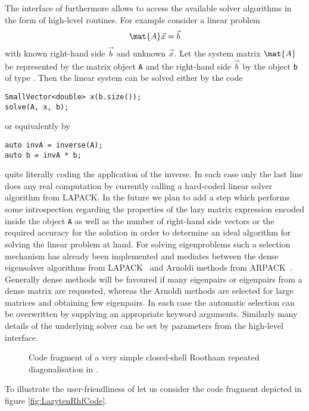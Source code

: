 The interface of \lazyten furthermore allows
to access the available solver algorithms
in the form of high-level routines.
For example consider a linear problem
\[\mat{A} \vec{x} = \vec{b}\]
with known right-hand side $\vec{b}$ and unknown $\vec{x}$.
Let the system matrix $\mat{A}$ be represented by the \lazyten matrix object \texttt{A}
and the right-hand side $\vec{b}$ by the object \texttt{b}
of type .
Then the linear system can be solved either by the code
\begin{lstlisting}[style=c++]
SmallVector<double> x(b.size());
solve(A, x, b);
\end{lstlisting}
or equivalently by
\begin{lstlisting}[style=c++]
auto invA = inverse(A);
auto b = invA * b;
\end{lstlisting}
\ie quite literally coding the application of the inverse.
In each case only the last line does any real computation
by currently calling a hard-coded linear solver algorithm from LAPACK.
In the future we plan to add a step which performs some introspection
regarding the properties of
the lazy matrix expression encoded inside the object \texttt{A}
as well as the number of right-hand side vectors or the required accuracy
for the solution in order to determine an
ideal algorithm for solving the linear problem at hand.
For solving eigenproblems such a
selection mechanism has already been implemented
and mediates between the dense eigensolver algorithms from LAPACK~
and Arnoldi methods from ARPACK~\cite{Lehoucq1998}.
Generally dense methods will be favoured if many eigenpairs
or eigenpairs from a dense matrix are requested,
whereas the Arnoldi methods are selected for large matrices and obtaining few eigenpairs.
In each case the automatic selection can be overwritten
by supplying an appropriate keyword arguments.
Similarly many details of the underlying solver can be set by parameters
from the high-level interface.

%

\begin{figure}
	\centering
	\caption{Code fragment of a very simple closed-shell Roothaan repeated diagonalisation
	\SCF in \lazyten.}
	\label{fig:LazytenRhfCode}
\end{figure}
To illustrate the user-friendliness of \lazyten
let us consider the code fragment depicted in figure \vref{fig:LazytenRhfCode}.


